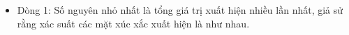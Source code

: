 \begin{itemize}
	\item     Dòng 1: Số nguyên nhỏ nhất là tổng giá trị xuất hiện nhiều lần nhất, giả sử rằng         xác suất các mặt xúc xắc xuất hiện là như nhau.   
\end{itemize}